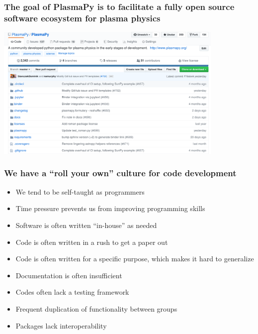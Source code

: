 \documentclass[default,compress]{beamer}
\begin{document}
\begin{frame}[plain]
    \frametitle{The goal of PlasmaPy is to facilitate a fully open source software ecosystem for plasma physics}
    \begin{center}
        \href{
            https://github.com/PlasmaPy/plasmapy
        }{
            \includegraphics[width=11.0cm]{PlasmaPy_mainpage.png}
        }
    \end{center}
\end{frame}


\begin{frame}[plain]
    \frametitle{We have a ``roll your own'' culture for code development}
    \begin{itemize}
    \item We tend to be self-taught as programmers
    \item Time pressure prevents us from improving programming skills
    \item Software is often written ``in-house'' as needed
    \item Code is often written in a rush to get a paper out
    \item Code is often written for a specific purpose, which makes it hard to generalize
    \item Documentation is often insufficient
    \item Codes often lack a testing framework
    \item Frequent duplication of functionality between groups
    \item Packages lack interoperability
    \end{itemize}
\end{frame}
\end{document}
